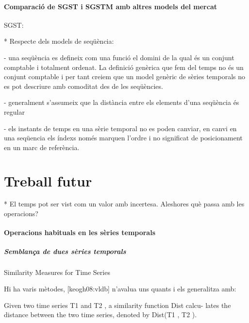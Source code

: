 \subsubsection{Comparació de SGST i SGSTM amb altres models del mercat}


SGST:

* Respecte dels models de seqüència: 

  - una seqüència es defineix com una funció el domini de la qual és un conjunt comptable i totalment ordenat. La definició genèrica que fem del temps no és un conjunt comptable i per tant creiem que un model genèric de sèries temporals no es pot descriure amb comoditat des de les seqüències. 

  - generalment s'assumeix que la distància entre els elements d'una seqüència és regular

  - els instants de temps en una sèrie temporal no es poden canviar, en canvi en una seqüencia els índexs només marquen l'ordre i no significat de posicionament en un marc de referència.







\chapter{Treball futur}






* El temps pot ser vist com un valor amb incertesa. Aleshores què passa amb les operacions?






\subsubsection{Operacions habituals en les sèries temporals}


\paragraph{Semblança de dues sèries temporals}


Similarity Measures for Time Series

Hi ha varis mètodes, [keogh08:vldb] n'avalua uns quants i els generalitza amb:

Given two
time series T1 and T2 , a similarity function Dist calcu-
lates the distance between the two time series, denoted by
Dist(T1 , T2 ).

